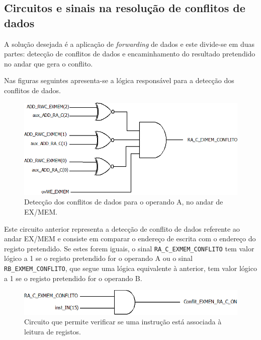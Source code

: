 \documentclass[11pt]{article}
\numberwithin{equation}{section}
\begin{document}
\subsection{Circuitos e sinais na resolução de conflitos de dados}

A solução desejada é a aplicação de \textit{forwarding} de dados e este divide-se em duas partes: detecção de conflitos de dados e encaminhamento do resultado pretendido no andar que gera o conflito.

Nas figuras seguintes apresenta-se a lógica responsável para a detecção dos conflitos de dados.

\begin{figure}[H]
	\centering
	\includegraphics[keepaspectratio=true, scale=0.27]{imagens/DetecaodeconflitoEXMEM}
	\vspace{-0.5em}
	\caption{Detecção dos conflitos de dados para o operando A, no andar de EX/MEM.}
	\vspace{-0.8em}
\end{figure} 

Este circuito anterior representa a detecção de conflito de dados referente ao andar EX/MEM e consiste em comparar o endereço de escrita com o endereço do registo pretendido. Se estes forem iguais, o sinal \texttt{RA\_C\_EXMEM\_CONFLITO} tem valor lógico a 1 se o registo pretendido for o operando A ou o sinal \texttt{RB\_EXMEM\_CONFLITO}, que segue uma lógica equivalente à anterior, tem valor lógico a 1 se o registo pretendido for o operando B.

\begin{figure}[H]
	\centering
	\includegraphics[keepaspectratio=true, scale=0.27]{imagens/DetecaodeconflitoEXMEM2}
	\vspace{-0.5em}
	\caption{Circuito que permite verificar se uma instrução está associada à leitura de registos.}
	\vspace{-0.8em}
\end{figure} 
\end{document}

